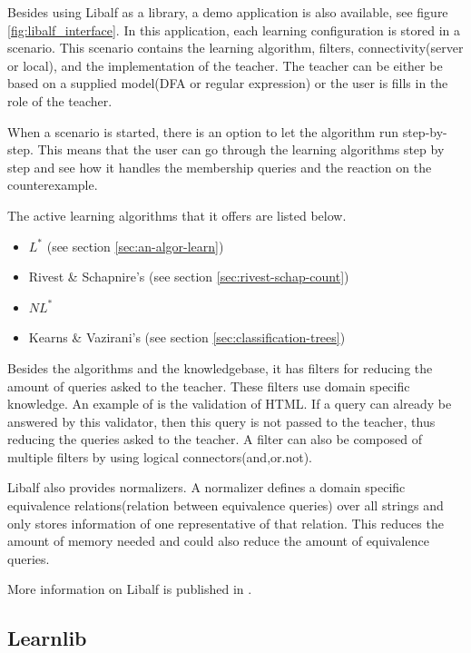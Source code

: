 \documentclass[multi,crop=false,class=article]{standalone}
\begin{document}
Besides using Libalf as a library, a demo application is also available, see 
figure \ref{fig:libalf_interface}. In this application, each learning 
configuration is stored in a scenario. This scenario contains the learning 
algorithm, filters, connectivity(server or local), and the implementation of 
the teacher. The teacher can be either be based on a supplied model(DFA or 
regular expression) or the user is fills in the role of the teacher.

When a scenario is started, there is an option to let the algorithm run 
step-by-step. This means that the user can go through the learning algorithms 
step by step and see how it handles the membership queries and the reaction on 
the counterexample. 

The active learning algorithms that it offers are listed below.

\begin{itemize}
	\item $L^*$ (see section \cref{sec:an-algor-learn})
	\item Rivest \& Schapnire's (see section \cref{sec:rivest-schap-count})
	\item $NL^*$ \cite{Bollig2009}
	\item Kearns \& Vazirani's (see section \cref{sec:classification-trees})
\end{itemize}

Besides the algorithms and the knowledgebase, it has filters for reducing the 
amount of queries asked to the teacher. These filters use domain specific 
knowledge. An example of is the validation of HTML. If a query can already be 
answered by this validator, then this query is not passed to the teacher, thus 
reducing the queries asked to the teacher.
A filter can also be composed of multiple filters by using logical 
connectors(and,or.not).

Libalf also provides normalizers. A normalizer defines a domain specific 
equivalence relations(relation between equivalence queries) over all strings 
and only stores information of one representative of that relation. This 
reduces the amount of memory needed and could also reduce the amount of 
equivalence queries.

More information on Libalf is published in \cite{Bollig2010}.

\subsection{Learnlib}
\label{ssec:learnlib}
\end{document}
